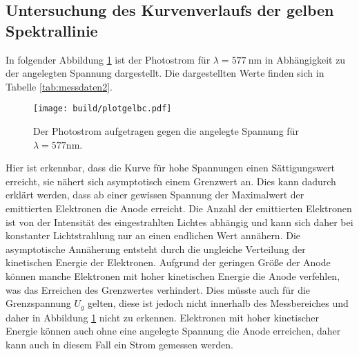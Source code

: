 \subsection{Untersuchung des Kurvenverlaufs der gelben Spektrallinie}
In folgender Abbildung \ref{fig:plotgelbc} ist der Photostrom für $\lambda = \SI{577}{\nano\meter}$ in
Abhängigkeit zu der angelegten Spannung dargestellt. Die dargestellten Werte finden
sich in Tabelle \ref{tab:messdaten2}.
\begin{figure}[H]
  \centering
  \texttt{[image: build/plotgelbc.pdf]}
  \caption{Der Photostrom aufgetragen gegen die angelegte Spannung für $\lambda = 577 \si{\nano\meter}$.}
  \label{fig:plotgelbc}
\end{figure}
\noindent
Hier ist erkennbar, dass die Kurve für hohe Spannungen einen Sättigungswert erreicht,
sie nähert sich asymptotisch einem Grenzwert an. Dies kann dadurch erklärt werden, dass ab
einer gewissen Spannung der Maximalwert der emittierten Elektronen die Anode erreicht. Die Anzahl
der emittierten Elektronen ist von der Intensität des eingestrahlten Lichtes abhängig
und kann sich daher bei konstanter Lichtstrahlung nur an einen endlichen Wert annähern.
Die asymptotische Annäherung entsteht durch die ungleiche Verteilung der kinetischen
Energie der Elektronen. Aufgrund der geringen Größe der Anode können manche Elektronen
mit hoher kinetischen Energie die Anode verfehlen, was das Erreichen des Grenzwertes
verhindert. Dies müsste auch für die Grenzspannung $U_g$ gelten, diese ist jedoch
nicht innerhalb des Messbereiches und daher in Abbildung \ref{fig:plotgelbc} nicht
zu erkennen. Elektronen mit hoher kinetischer Energie können auch ohne eine angelegte
Spannung die Anode erreichen, daher kann auch in diesem Fall ein Strom gemessen werden.
